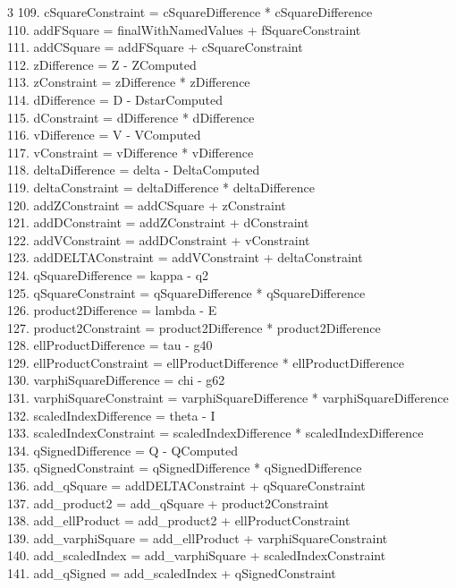 \documentclass[10pt]{article}
\begin{document}
\begin{multicols}{3}
109. cSquareConstraint = cSquareDifference * cSquareDifference\\
110. addFSquare = finalWithNamedValues + fSquareConstraint\\
111. addCSquare = addFSquare + cSquareConstraint\\
112. zDifference = Z - ZComputed\\
113. zConstraint = zDifference * zDifference\\
114. dDifference = D - DstarComputed\\
115. dConstraint = dDifference * dDifference\\
116. vDifference = V - VComputed\\
117. vConstraint = vDifference * vDifference\\
118. deltaDifference = delta - DeltaComputed\\
119. deltaConstraint = deltaDifference * deltaDifference\\
120. addZConstraint = addCSquare + zConstraint\\
121. addDConstraint = addZConstraint + dConstraint\\
122. addVConstraint = addDConstraint + vConstraint\\
123. addDELTAConstraint = addVConstraint + deltaConstraint\\
124. qSquareDifference = kappa - q2\\
125. qSquareConstraint = qSquareDifference * qSquareDifference\\
126. product2Difference = lambda - E\\
127. product2Constraint = product2Difference * product2Difference\\
128. ellProductDifference = tau - g40\\
129. ellProductConstraint = ellProductDifference * ellProductDifference\\
130. varphiSquareDifference = chi - g62\\
131. varphiSquareConstraint = varphiSquareDifference * varphiSquareDifference\\
132. scaledIndexDifference = theta - I\\
133. scaledIndexConstraint = scaledIndexDifference * scaledIndexDifference\\
134. qSignedDifference = Q - QComputed\\
135. qSignedConstraint = qSignedDifference * qSignedDifference\\
136. add\_qSquare = addDELTAConstraint + qSquareConstraint\\
137. add\_product2 = add\_qSquare + product2Constraint\\
138. add\_ellProduct = add\_product2 + ellProductConstraint\\
139. add\_varphiSquare = add\_ellProduct + varphiSquareConstraint\\
140. add\_scaledIndex = add\_varphiSquare + scaledIndexConstraint\\
141. add\_qSigned = add\_scaledIndex + qSignedConstraint\\
\end{multicols}
\end{document}
